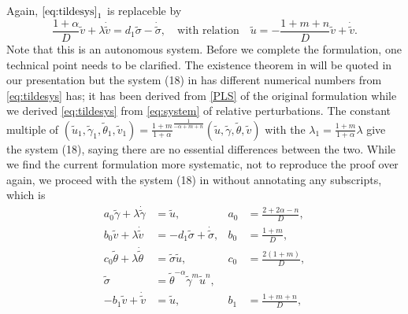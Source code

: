 \documentclass[a4paper,11pt]{article}
\def\tg{{\tilde{\gamma}}}
\def\tv{{\tilde{v}}}
\def\tth{{\tilde{\theta}}}
\def\ts{{\tilde{\sigma}}}
\def\tu{{\tilde{u}}}
\def\dtg{{\dot{\tilde{\gamma}}}}
\def\dtv{{\dot{\tilde{v}}}}
\def\dtth{{\dot{\tilde{\theta}}}}
\def\dts{{\dot{\tilde{\sigma}}}}
\theoremstyle{remark}
\begin{document}
Again, $\eqref{eq:tildesys}_1$ is replaceble by
$$\frac{1+ \alpha}{D} \tv + \lambda \dot\tv = d_1 \ts -\dot\ts, \quad \text{with relation} \quad \tu = -\frac{1+m+n}{D}\tv + \dot\tv.$$
Note that this is an autonomous system. Before we complete the formulation, one technical point needs to be clarified. The existence theorem in \cite{KLT17} will be quoted in our presentation but the system (18) in \cite{KLT17} has different numerical numbers from \eqref{eq:tildesys} has; it has been derived from \eqref{PLS} of the original formulation while we derived \eqref{eq:tildesys} from \eqref{eq:system} of relative perturbations. The constant multiple of $(\tu_1,\tg_1,\tth_1,\tv_1)=\frac{1+m}{1+\alpha}^{\frac{1}{-\alpha+m+n}}(\tu,\tg,\tth,\tv)$ with the $\lambda_1 =\frac{1+m}{1+\alpha}\lambda$ give the system (18), saying there are no essential differences between the two. While we find the current formulation more systematic, not to reproduce the proof over again, we proceed with the system (18) in \cite{KLT17} without annotating any subscripts, which is
\begin{equation} \label{eq:tildesys2}
 \begin{aligned}
  a_0\tg + \lambda\dtg &=\tu, & a_0&=\frac{2+2\alpha-n}{D},\\
  b_0\tv + \lambda\dtv &=-d_1 \ts + \dts,& b_0&=\frac{1+m}{D},\\
  c_0\tth+ \lambda\dtth&=\ts\tu, & c_0&=\frac{2(1+m)}{D},\\
  \ts &=\tth^{-\alpha}\tg^m\tu^n, \\
  -b_1\tv+\dtv &= \tu, & b_1&=\frac{1+m+n}{D},
 \end{aligned}
\end{equation}
\end{document}
